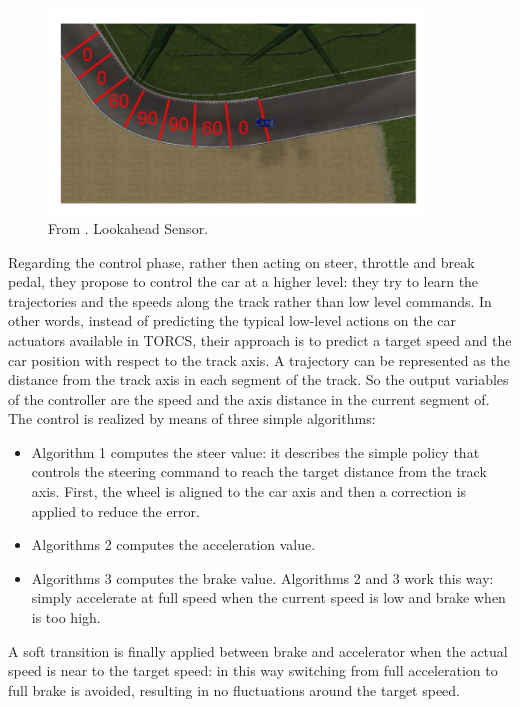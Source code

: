 \begin{figure}
 \centering
  \captionsetup{width=10cm}
  \includegraphics[width=10cm]{./img/cardamone2}
  \caption{From \cite{cardamone}. Lookahead Sensor.}
\end{figure}

Regarding the control phase, rather then acting on steer, throttle and break pedal, they propose  to control the car at a higher
level: they try to learn the trajectories and the speeds along
the track rather than low level commands.
In other words, instead of predicting the typical low-level actions on the car actuators available in TORCS, their approach is to predict a target speed and the car position with respect to the track axis.
A trajectory can be represented as the distance from the track axis in each segment of the track. So the output variables of the controller are the speed and the axis distance in the current segment of.
The control is realized by means of three simple algorithms:
\begin{itemize}
\item Algorithm 1 computes the steer value: it describes the simple policy that controls the steering command to reach the target distance from the track axis. First, the wheel is aligned to the car axis and then a correction is applied to reduce the error.
\item Algorithms 2 computes the acceleration value.
\item Algorithms 3 computes the brake value. 
Algorithms 2 and 3 work this way: simply accelerate at full speed when the current speed is low and brake when is too high. 
\end{itemize}
A soft transition is finally applied between brake and accelerator when the actual speed is near to the target speed: in this way switching from full acceleration to full brake is avoided, resulting in no fluctuations around the target speed.

